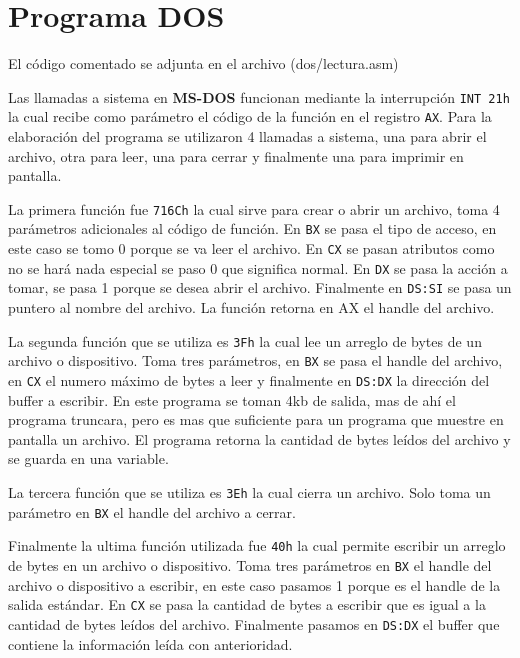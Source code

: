 
\section{Programa DOS}

El código comentado se adjunta en el archivo (dos/lectura.asm)

Las llamadas a sistema en \textbf{MS-DOS} funcionan mediante la interrupción
\verb|INT 21h| la cual recibe como parámetro el código de la función en el
registro \verb|AX|. Para la elaboración del programa se utilizaron 4 llamadas a
sistema, una para abrir el archivo, otra para leer, una para cerrar y
finalmente una para imprimir en pantalla.

La primera función fue \verb|716Ch| la cual sirve para crear o abrir un
archivo, toma 4 parámetros adicionales al código de función. En \verb|BX|
se pasa el tipo de acceso, en este caso se tomo 0 porque se va leer el archivo.
En \verb|CX| se pasan atributos como no se hará nada especial se paso 0 que significa
normal.  En \verb|DX| se pasa la acción a tomar, se pasa 1 porque se desea abrir
el archivo. Finalmente en \verb|DS:SI| se pasa un puntero al nombre del
archivo. La función retorna en AX el handle del archivo.

La segunda función que se utiliza es \verb|3Fh| la cual lee un arreglo de
bytes de un archivo o dispositivo. Toma tres parámetros, en \verb|BX|
se pasa el handle del archivo, en \verb|CX| el numero máximo de bytes a leer
y finalmente en \verb|DS:DX| la dirección del buffer a escribir. En este
programa se toman 4kb de salida, mas de ahí el programa truncara, pero
es mas que suficiente para un programa que muestre en pantalla un archivo.
El programa retorna la cantidad de bytes leídos del archivo y se guarda en una
variable.

La tercera función que se utiliza es \verb|3Eh| la cual cierra un archivo.
Solo toma un parámetro en \verb|BX| el handle del archivo a cerrar.

Finalmente la ultima función utilizada fue \verb|40h| la cual permite
escribir un arreglo de bytes en un archivo o dispositivo. Toma tres parámetros
en \verb|BX| el handle del archivo o dispositivo a escribir, en este
caso pasamos 1 porque es el handle de la salida estándar. En \verb|CX|
se pasa la cantidad de bytes a escribir que es igual a la cantidad de
bytes leídos del archivo. Finalmente pasamos en \verb|DS:DX| el buffer
que contiene la información leída con anterioridad.



